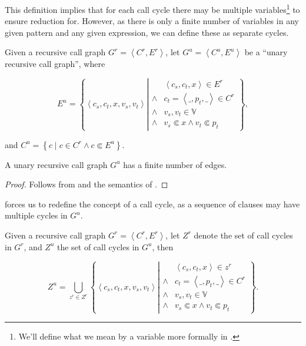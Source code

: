 This definition implies that for each call cycle there may be multiple
variables\footnote{We'll define what we mean by a variable more formally in
.} to ensure reduction for. However, as there is
only a finite number of variables in any given pattern and any given
expression, we can define these as separate cycles.

\begin{definition}\label{definition:variable-call-graph} Given a recursive call
graph $G^r = \left\langle C^r, E^r \right\rangle$, let $G^u= \left\langle C^u,
E^u \right\rangle$ be a ``unary recursive call graph'', where

$$E^u = \left\{ \left\langle c_s, c_t, x, v_s, v_t \right\rangle \left|
\begin{array}{ll}
&\left\langle c_s, c_t,x \right\rangle \in E^r\\
\wedge&c_t = \left\langle \_, p_t, \_ \right\rangle \in C^r \\
\wedge&v_s,v_t\in\mathbb{V}\\
\wedge&v_s\Subset x \wedge v_t \Subset p_t
\end{array}
\right.\right\},$$

and $C^u= \left\{ c \mid c \in C^r \wedge c\Subset E^u
\right\}$.\end{definition}

\begin{theorem}\label{theorem:unary-finite} A unary recursive call graph $G^u$
has a finite number of edges.\end{theorem}

\begin{proof} Follows from  and the
semantics of \D{}.\end{proof}

 forces us to redefine the concept of a
call cycle, as a sequence of clauses may have multiple cycles in $G^u$.

\begin{definition}\label{definition:variable-call-cycle} Given a recursive call
graph $G^r = \left\langle C^r, E^r \right\rangle$, let $Z^r$ denote the set of
call cycles in $G^r$, and $Z^u$ the set of call cycles in $G^u$, then

$$Z^u = \bigcup_{z^r\in Z^r} \left\{ \left\langle c_s, c_t, x, v_s, v_t \right\rangle \left|
\begin{array}{ll}
&\left\langle c_s, c_t,x \right\rangle \in z^r\\
\wedge&c_t = \left\langle \_, p_t, \_ \right\rangle \in C^r \\
\wedge&v_s,v_t\in\mathbb{V}\\
\wedge&v_s\Subset x \wedge v_t \Subset p_t
\end{array}
\right.\right\}.$$

\end{definition}

